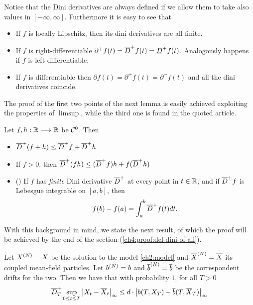 \begin{remark}
	Notice that the Dini derivatives are always defined if we allow them to take also values in $[-\infty, \infty]$.
	Furthermore it is easy to see that
	\begin{itemize}
		\item If $f$ is locally Lipschitz, then its dini derivatives are all finite.
		\item If $f$ is right-differentiable $\partial^+ f (t) = \overline{D}^+ f (t) = \underline{D}^+ f (t)$.
			Analogously happens if $f$ is left-differentiable.
		\item If $f$ is differentiable then $\partial f (t) = \partial^+ f (t) = \partial^- f (t)$ and all the dini derivatives coincide.
	\end{itemize}
\end{remark}

The proof of the first two points of the next lemma is easily achieved exploiting the properties of $\limsup$, while the third one is found in the quoted article.

\begin{lemma}
	Let $f,h: \mathbb{R} \longrightarrow \mathbb{R}$ be $\mathcal{C}^0$.
	Then
	\begin{itemize}
		\item $\overline{D}^+ (f + h) \leq \overline{D}^+ f + \overline{D}^+h$
		\item If $f > 0$. then $\overline{D}^+ (fh) \leq (\overline{D}^+f) h + f(\overline{D}^+h)$
		\item (\autocite[Theorem 11]{dini-derivatives}) If $f$ has \emph{finite} Dini derivative $\overline{D}^+$ at every point in $t\in\mathbb{R}$, and if $\overline{D}^+f$ is Lebesgue integrable on $[a,b]$, then
			\begin{equation}
				f(b) - f(a) = \int_a^b \overline{D}^+ f (t) dt.
			\end{equation}
	\end{itemize}
\end{lemma}

With this background in mind, we state the next result, of which the proof will be achieved by the end of the section (\ref{ch4:proof:del-dini-of-all}).

\begin{lemma}\label{ch4:lemma:del-dini-of-all}
	Let $X^{(N)} = X$ be the solution to the model \ref{ch2:model} and $\overline{X}^{(N)} = \overline{X}$ its coupled mean-field particles.
	Let $b^{(N)}=b$ and $\overline{b}^{(N)} = \overline{b}$ be the correspondent drifts for the two.
	Then we have that with probability $1$, for all $T>0$
	\begin{equation}
		\overline{D}_T^+ \sup_{0 \leq t \leq T} { \left| X_t-\overline{X}_t \right|_{\infty} }
		\leq
		d \cdot 
			{ \left| b(T, X_T) - \overline{b}(T, \overline{X}_T) \right|_{\infty} }
	\end{equation}
\end{lemma}

